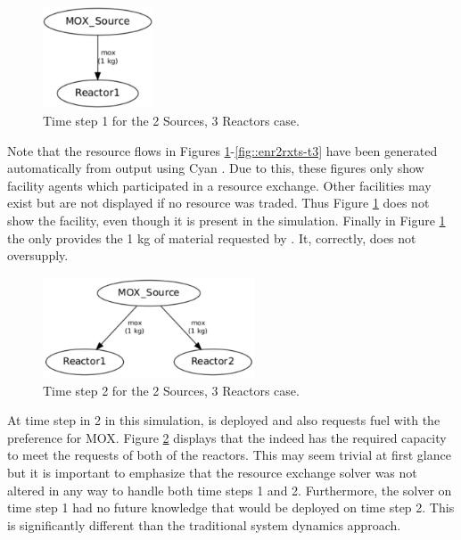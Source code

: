 \begin{figure}
  \begin{center}
    \includegraphics[height=3cm]{./figs/2_Sources_3_Reactors-t1.pdf}
    \caption[]{\label{fig::2srcs3rxts-t1}Time step 1 for the 2 Sources, 3 Reactors 
        case.}
  \end{center}
\end{figure}

Note that the resource flows in Figures 
\ref{fig::2srcs3rxts-t1}-\ref{fig::enr2rxts-t3}
have been generated automatically from \Cyclus{} output using
Cyan \cite{Carlsen2014}.  Due to this, these figures only show facility agents
which participated in a resource exchange. Other facilities may exist but are
not displayed if no resource was traded.  Thus Figure \ref{fig::2srcs3rxts-t1}
does not show the \UOXSource{} facility, even though it is present in the
simulation.  Finally in Figure \ref{fig::2srcs3rxts-t1} the \MOXSource{} only
provides the 1 kg of material requested by .  It, correctly, does not
oversupply.

\begin{figure}
  \begin{center}
    \includegraphics[height=3cm]{./figs/2_Sources_3_Reactors-t2.pdf}
    \caption[]{\label{fig::2srcs3rxts-t2}Time step 2 for the 2 Sources, 3 Reactors 
        case.}
  \end{center}
\end{figure}

At time step in 2 in this simulation,  is deployed and also requests 
fuel with the preference for MOX.  Figure \ref{fig::2srcs3rxts-t2} displays
that the \MOXSource{} indeed has the required capacity to meet the requests of 
both of the reactors.  This may seem trivial at first glance but it is important 
to emphasize that the resource exchange solver was not altered in any way to handle 
both time steps 1 and 2.  Furthermore, the solver on time step 1 had no future 
knowledge that  would be deployed on time step 2.  This is significantly 
different than the traditional system dynamics approach.

